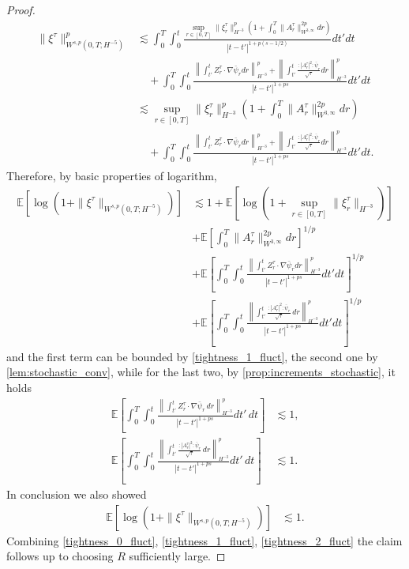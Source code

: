 \documentclass[a4paper,10pt]{amsart}
\newcommand{\norm}[1]{\left\|#1\right\|}
\newcommand{\wick}[1]{:\mathrel{#1}:}
\newcommand{\expt}[1]{\mathbb{E}\left[#1\right]}
\theoremstyle{remark}
\numberwithin{equation}{section}
\begin{document}
\begin{proof}
    \begin{align*}
        \|\xi^{\tau}\|_{W^{s,p}(0,T;H^{-5})}^p&\lesssim\int_0^T\int_0^t \frac{\sup_{r\in [0,T]}\|\xi^{\tau}_r\|_{H^{-3}}^p\left(1+\int_0^T\|A^{\tau}_r\|^{2p}_{W^{3,\infty}}dr\right)}{|t-t'|^{1+p(s-1/2)}}dt' dt\\
        &\quad+\int_0^T\int_0^t \frac{\norm{\int_{t'}^t Z^{\tau}_r\cdot\nabla\bar{\psi}_r dr}_{H^{-3}}^p+\norm{\int_{t'}^t \frac{\wick{|A^\tau_r|^2}\bar{\psi}_r}{\sqrt{\tau}} dr}_{H^{-3}}^p}{|t-t'|^{1+ps}}dt' dt\\
        &\lesssim \sup_{r\in [0,T]}\|\xi^{\tau}_r\|_{H^{-3}}^p\left(1+\int_0^T\|A^{\tau}_r\|^{2p}_{W^{3,\infty}}dr\right)\\
        &\quad+\int_0^T\int_0^t \frac{\norm{\int_{t'}^t Z^{\tau}_r\cdot\nabla\bar{\psi}_r dr}_{H^{-3}}^p+\norm{\int_{t'}^t \frac{\wick{|A^\tau_r|^2}\bar{\psi}_r}{\sqrt{\tau}} dr}_{H^{-3}}^p}{|t-t'|^{1+ps}}dt' dt.
    \end{align*}
    Therefore, by basic properties of logarithm,
    \begin{align*}
        \expt{\log\left(1+\|\xi^{\tau}\|_{W^{s,p}(0,T;H^{-5})}\right)}& \lesssim 1+ \expt{\log\left(1+\sup_{r\in [0,T]}\|\xi^{\tau}_r\|_{H^{-3}}\right)}\\ & +\expt{\int_0^T\|A^{\tau}_r\|^{2p}_{W^{3,\infty}}dr}^{1/p}\\ & + \expt{\int_0^T\int_0^t \frac{\norm{\int_{t'}^t Z^{\tau}_r\cdot\nabla\bar{\psi}_r dr}_{H^{-3}}^p}{|t-t'|^{1+ps}}dt' dt}^{1/p}\\ &
        +\expt{\int_0^T\int_0^t
        \frac{\norm{\int_{t'}^t
        \frac{\wick{|A^\tau_r|^2}\bar{\psi}_r}{\sqrt{\tau}}\,dr}_{H^{-3}}^p}
        {|t-t'|^{1+ps}}dt' dt}^{1/p}
    \end{align*}
    and the first term can be bounded by \eqref{tightness_1_fluct}, the second one by \cref{lem:stochastic_conv}, while for the last two, by \cref{prop:increments_stochastic}, it holds
    \begin{align*}
        \expt{\int_0^T\int_0^t
        \frac{\norm{\int_{t'}^t
        Z^{\tau}_r\cdot\nabla\bar{\psi}_r\,dr}_{H^{-3}}^p}
        {|t-t'|^{1+ps}}dt'\,dt}
        &\lesssim1,\\
        \expt{\int_0^T\int_0^t
        \frac{\norm{\int_{t'}^t
        \frac{\wick{|A^\tau_r|^2}\bar{\psi}_r}{\sqrt{\tau}}\,dr}_{H^{-3}}^p}
        {|t-t'|^{1+ps}}dt'\,dt}
        &\lesssim1.
    \end{align*}
    In conclusion we also showed
    \begin{align}\label{tightness_2_fluct}
         \expt{\log\left(1+\|\xi^{\tau}\|_{W^{s,p}(0,T;H^{-5})}\right)}&\lesssim 1.
    \end{align}
    Combining \eqref{tightness_0_fluct}, \eqref{tightness_1_fluct}, \eqref{tightness_2_fluct} the claim follows up to choosing $R$ sufficiently large.
\end{proof}
\end{document}
